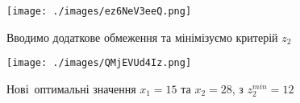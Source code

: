 \begin{figure}[!ht]
    \centering
    \texttt{[image: ./images/ez6NeV3eeQ.png]}
    \caption{Вводимо додаткове обмеження та мінімізуємо критерій $z_2$}
    \label{fig:graph1}
\end{figure}

\begin{figure}[!ht]
    \centering
    \texttt{[image: ./images/QMjEVUd4Iz.png]}
    \caption{Нові оптимальні значення $x_1 = 15$ та $x_2 = 28$, з $z_2^{min} = 12$}
    \label{fig:graph3}
\end{figure}
